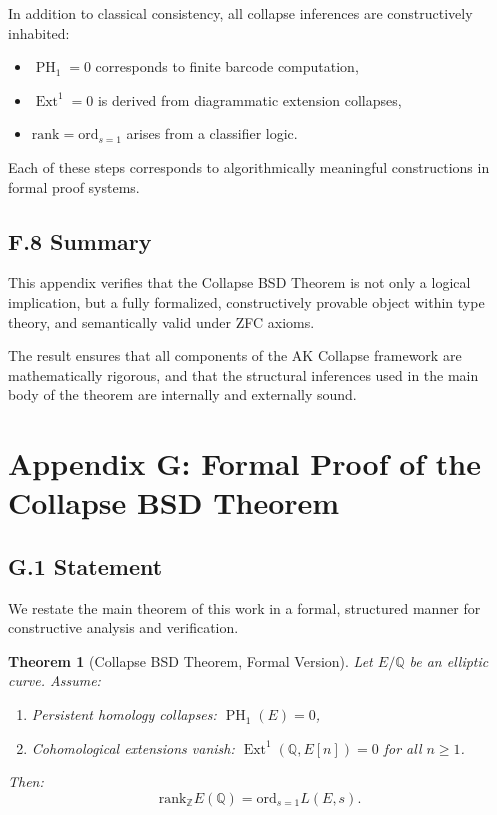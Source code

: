 \documentclass[11pt]{article}
\newtheorem{theorem}{Theorem}[section]
\DeclareMathOperator{\Ext}{Ext}
\DeclareMathOperator{\PH}{PH}
\newcommand{\QQ}{\mathbb{Q}}
\newcommand{\ZZ}{\mathbb{Z}}
\begin{document}
In addition to classical consistency, all collapse inferences are constructively inhabited:

\begin{itemize}
  \item $\PH_1 = 0$ corresponds to finite barcode computation,
  \item $\Ext^1 = 0$ is derived from diagrammatic extension collapses,
  \item $\mathrm{rank} = \mathrm{ord}_{s=1}$ arises from a classifier logic.
\end{itemize}

Each of these steps corresponds to algorithmically meaningful constructions in formal proof systems.

\subsection*{F.8 Summary}

This appendix verifies that the Collapse BSD Theorem is not only a logical implication,  
but a fully formalized, constructively provable object within type theory, and semantically valid under ZFC axioms.

The result ensures that all components of the AK Collapse framework are mathematically rigorous, and that the structural inferences used in the main body of the theorem are internally and externally sound.




\section*{Appendix G: Formal Proof of the Collapse BSD Theorem}

\subsection*{G.1 Statement}

We restate the main theorem of this work in a formal, structured manner for constructive analysis and verification.

\begin{theorem}[Collapse BSD Theorem, Formal Version]
\label{thm:collapse-bsd-formal}
Let $E/\QQ$ be an elliptic curve. Assume:
\begin{enumerate}
  \item[\textbf{(A)}] Persistent homology collapses: $\PH_1(E) = 0$,
  \item[\textbf{(B)}] Cohomological extensions vanish: $\Ext^1(\QQ, E[n]) = 0$ for all $n \geq 1$.
\end{enumerate}

Then:
\[
\mathrm{rank}_{\ZZ} E(\QQ) = \mathrm{ord}_{s=1} L(E,s).
\]
\end{theorem}
\end{document}
